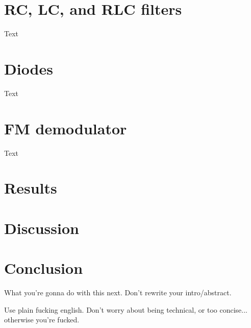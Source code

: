\documentclass[11pt]{article}
\begin{document}
\section{RC, LC, and RLC filters}

Text

\section{Diodes}

Text

\section{FM demodulator}

Text

\section{Results}

\section{Discussion}

\section{Conclusion}

What you're gonna do with this next.  Don't rewrite your intro/abstract.

Use plain fucking english.  Don't worry about being technical, or too
concise... otherwise you're fucked.
\end{document}
